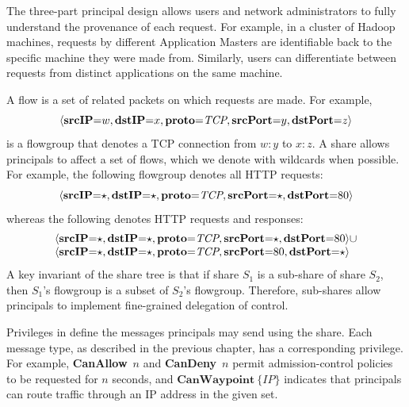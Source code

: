 The three-part principal design allows users and network
administrators to fully understand the provenance of each request. For
example, in a cluster of Hadoop machines, requests by different
Application Masters are identifiable back to the specific machine they
were made from. Similarly, users can differentiate between requests from
distinct applications on the same machine.

\label{sec:Flowgroups}
A flow is a set of related packets on which requests are
made. For example,
\[
\langle\textbf{srcIP}\mathord{=}w,\textbf{dstIP}\mathord{=}x,\textbf{proto}\mathord{=}\textit{TCP},\textbf{srcPort}\mathord{=}y,\textbf{dstPort}\mathord{=}z\rangle
\]
is a flowgroup that denotes a TCP connection from $w:y$ to $x:z$. A
\sys share allows principals to affect a set of flows, which we denote
with wildcards when possible. For example, the following flowgroup
denotes all HTTP requests:
\[ 
  \langle\textbf{srcIP}\mathord{=}\star,\textbf{dstIP}\mathord{=}\star,\textbf{proto}\mathord{=}\textit{TCP},\textbf{srcPort}\mathord{=}\star,\textbf{dstPort}\mathord{=}80\rangle 
\]
whereas the following denotes HTTP requests and responses:
\[
  \begin{array}{l@{}l}
  \paneshare{\star}{\star}{\textit{TCP}}{\star}{80} & \cup \\
  \paneshare{\star}{\star}{\textit{TCP}}{80}{\star}
  \end{array}
\]
A key invariant of the share tree is that if share $S_1$ is a
sub-share of share $S_2$, then $S_1$'s flowgroup is a subset of $S_2$'s
flowgroup. Therefore, sub-shares allow principals to implement
fine-grained delegation of control.

%
Privileges in \sys define the messages principals may send using the share.
Each message type, as described in the previous chapter, has a corresponding
privilege. For example,
\textbf{CanAllow}~$n$ and \textbf{CanDeny}~$n$ permit
admission-control policies to be requested for $n$ seconds, and $\textbf{CanWaypoint}~\{\textit{IP}\}$
indicates that principals can route traffic through an IP address in the given set.
